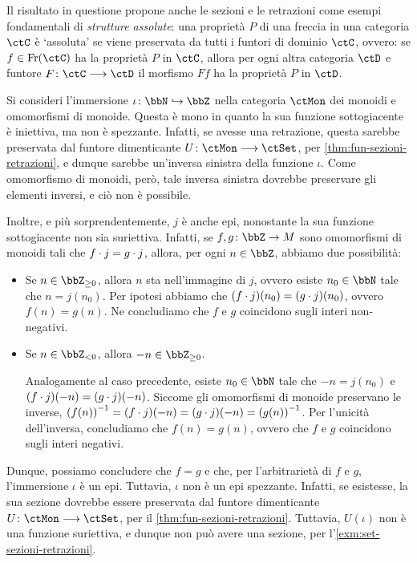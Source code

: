 Il risultato in questione propone anche le sezioni e le retrazioni come esempi fondamentali di \emph{strutture assolute}: una proprietà \(P\) di una freccia in una categoria \(\ctC\) è `assoluta' se viene preservata da tutti i funtori di dominio \(\ctC\), ovvero: se \(f\in\varHom(\ctC)\) ha la proprietà \(P\) in \(\ctC\), allora per ogni altra categoria \(\ctD\) e funtore \(F \colon \ctC\fun\ctD\) il morfismo \(Ff\) ha la proprietà \(P\) in \(\ctD\).
\begin{example}\label{mono_epi_noniso}
 Si consideri l'immersione \(\iota \colon \bbN \mono \bbZ\)	nella categoria \(\ctMon\) dei monoidi e omomorfismi di monoide.	Questa è mono in quanto la sua funzione sottogiacente è iniettiva,	ma non è spezzante.	Infatti, se avesse una retrazione,	questa sarebbe preservata dal funtore dimenticante \(U \colon \ctMon \fun \ctSet\),	per \ref{thm:fun-sezioni-retrazioni},	e dunque sarebbe un'inversa sinistra della funzione \(\iota\).	Come omomorfismo di monoidi, però, tale inversa sinistra dovrebbe preservare gli elementi inversi,	e ciò non è possibile.

 Inoltre, e più sorprendentemente, \( j\) è anche epi,	nonostante la sua funzione sottogiacente non sia suriettiva.	Infatti, se \(f, g \colon \bbZ \to M\) sono omomorfismi di monoidi tali che \(f\cdot j = g\cdot j\),	allora, per ogni \(n \in \bbZ\),	abbiamo due possibilità:
 \begin{itemize}
  \item Se \(n \in \bbZ_{\geq 0}\), allora \(n\) sta nell'immagine di \( j\), ovvero esiste \(n_0 \in \bbN\) tale che \(n =  j(n_0)\). Per ipotesi abbiamo che \((f\cdot j) (n_0) = (g\cdot j) (n_0)\), ovvero \(f (n) = g (n)\). Ne concludiamo che \(f\) e \(g\) coincidono sugli interi non-negativi.
  \item Se \(n \in \bbZ_{< 0}\), allora \(-n \in \bbZ_{\geq 0}\).

        Analogamente al caso precedente, esiste \(n_0 \in \bbN\) tale che \(-n =  j(n_0)\) e \((f\cdot j) (-n) = (g\cdot j) (-n)\). Siccome gli omomorfismi di monoide preservano le inverse, \({(f (n))}^{-1} = (f\cdot j) {(-n)} = (g\cdot j) (-n) = {(g (n))}^{-1}\). Per l'unicità dell'inversa, concludiamo che \(f (n) = g (n)\), ovvero che \(f\) e \(g\) coincidono sugli interi negativi.
 \end{itemize}
 Dunque, possiamo concludere che \(f = g\) e che, per l'arbitrarietà di \(f\) e \(g\), l'immersione \(\iota\) è un epi. Tuttavia, \(\iota\) non è un epi spezzante. Infatti, se esistesse, la sua sezione dovrebbe essere preservata dal funtore dimenticante \(U \colon \ctMon \fun \ctSet\), per il \autoref{thm:fun-sezioni-retrazioni}. Tuttavia, \(U(\iota)\) non è una funzione suriettiva, e dunque non può avere una sezione, per l'\autoref{exm:set-sezioni-retrazioni}.
\end{example}
